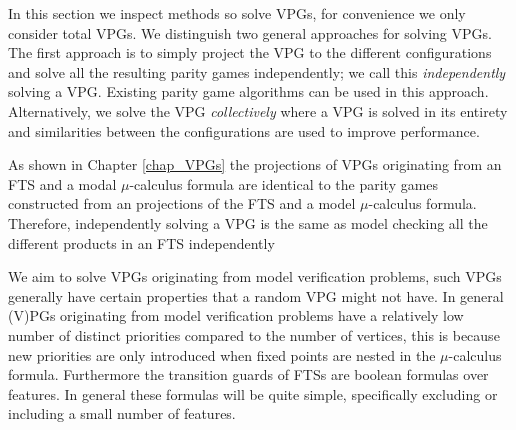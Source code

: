 In this section we inspect methods so solve VPGs, for convenience we only consider total VPGs. We distinguish two general approaches for solving VPGs. The first approach is to simply project the VPG to the different configurations and solve all the resulting parity games independently; we call this \textit{independently} solving a VPG. Existing parity game algorithms can be used in this approach. Alternatively, we solve the VPG \textit{collectively} where a VPG is solved in its entirety and similarities between the configurations are used to improve performance.

As shown in Chapter \ref{chap_VPGs} the projections of VPGs originating from an FTS and a modal $\mu$-calculus formula are identical to the parity games constructed from an projections of the FTS and a model $\mu$-calculus formula. Therefore, independently solving a VPG is the same as model checking all the different products in an FTS independently

We aim to solve VPGs originating from model verification problems, such VPGs generally have certain properties that a random VPG might not have. In general (V)PGs originating from model verification problems have a relatively low number of distinct priorities compared to the number of vertices, this is because new priorities are only introduced when fixed points are nested in the $\mu$-calculus formula. Furthermore the transition guards of FTSs are boolean formulas over features. In general these formulas will be quite simple, specifically excluding or including a small number of features.